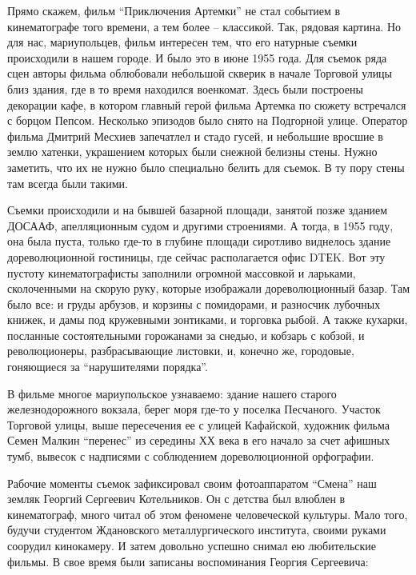 Прямо скажем, фильм \enquote{Приключения Артемки} не стал событием в кинематографе того
времени, а тем более – классикой. Так, рядовая картина. Но для нас,
мариупольцев, фильм интересен тем, что его натурные съемки происходили в нашем
городе. И было это в июне 1955 года. Для съемок ряда сцен авторы фильма
облюбовали небольшой скверик в начале Торговой улицы близ здания, где в то
время находился военкомат. Здесь были построены декорации кафе, в котором
главный герой фильма Артемка по сюжету встречался с борцом Пепсом. Несколько
эпизодов было снято на Подгорной улице. Оператор фильма Дмитрий Месхиев
запечатлел и стадо гусей, и небольшие вросшие в землю хатенки, украшением
которых были снежной белизны стены. Нужно заметить, что их не нужно было
специально белить для съемок. В ту пору стены там всегда были такими.


Съемки происходили и на бывшей базарной площади, занятой позже зданием ДОСААФ,
апелляционным судом и другими строениями. А тогда, в 1955 году, она была пуста,
только где-то в глубине площади сиротливо виднелось здание дореволюционной
гостиницы, где сейчас располагается офис DTЕK. Вот эту пустоту кинематографисты
заполнили огромной массовкой и ларьками, сколоченными на скорую руку, которые
изображали дореволюционный базар. Там было все: и груды арбузов, и корзины с
помидорами, и разносчик лубочных книжек, и дамы под кружевными зонтиками, и
торговка рыбой. А также кухарки, посланные состоятельными горожанами за снедью,
и кобзарь с кобзой, и революционеры, разбрасывающие листовки, и, конечно же,
городовые, гоняющиеся за \enquote{нарушителями порядка}.


В фильме многое мариупольское узнаваемо: здание нашего старого железнодорожного
вокзала, берег моря где-то у поселка Песчаного. Участок Торговой улицы, выше
пересечения ее с улицей Кафайской, художник фильма Семен Малкин \enquote{перенес} из
середины ХХ века в его начало за счет афишных тумб, вывесок с надписями с
соблюдением дореволюционной орфографии.

Рабочие моменты съемок зафиксировал своим фотоаппаратом \enquote{Смена} наш земляк
Георгий Сергеевич Котельников. Он с детства был влюблен в кинематограф, много
читал об этом феномене человеческой культуры. Мало того, будучи студентом
Ждановского металлургического института, своими руками соорудил кинокамеру. И
затем довольно успешно снимал ею любительские фильмы. В свое время были
записаны воспоминания Георгия Сергеевича:

